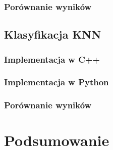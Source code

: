 \documentclass[a4paper,11pt]{article}
\begin{document}
\subsubsection{Porównanie wyników} 
\newpage
\subsection{Klasyfikacja KNN} 
\subsubsection{Implementacja w C++} 
\subsubsection{Implementacja w Python} 
\subsubsection{Porównanie wyników} 
\newpage
\section{Podsumowanie} 
 
\end{document}
